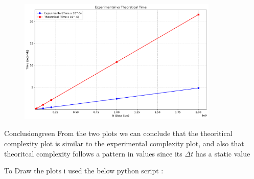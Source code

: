 
\begin{figure}[h!]
    \centering
    \includegraphics[width=0.85\textwidth]{Questions/Part2/plot.pdf}
    \label{fig:time_plot}
\end{figure}

\vspace{1cm}

\begin{prettyBox}{Conclusion}{green}
From the two plots we can conclude that the theoritical complexity plot is similar to the experimental complexity plot,
and also that theoritcal complexity follows a pattern in values since its \(\Delta t\) has a static value
\end{prettyBox}

\newpage 

To Draw the plots i used the below python script :

\vspace{1cm}


